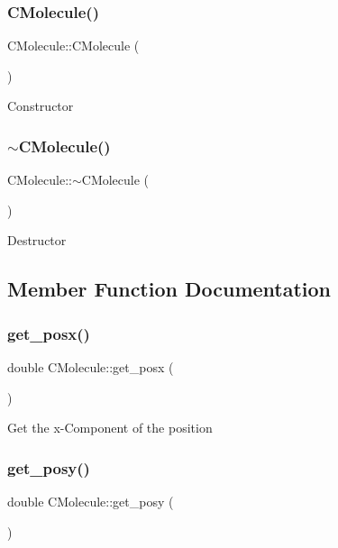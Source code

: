 \subsubsection{\texorpdfstring{C\+Molecule()}{CMolecule()}}
{\footnotesize\ttfamily C\+Molecule\+::\+C\+Molecule (\begin{DoxyParamCaption}{ }\end{DoxyParamCaption})}

Constructor \mbox{\label{classCMolecule_a8e59e7e7ff05b619a9e201c3263921c5}} 
\subsubsection{\texorpdfstring{$\sim$\+C\+Molecule()}{~CMolecule()}}
{\footnotesize\ttfamily C\+Molecule\+::$\sim$\+C\+Molecule (\begin{DoxyParamCaption}{ }\end{DoxyParamCaption})\hspace{0.3cm}{\ttfamily [virtual]}}

Destructor 

\subsection{Member Function Documentation}
\mbox{\label{classCMolecule_ac76dbb1e5abbc9fbadcd568d0f2e7d16}} 
\subsubsection{\texorpdfstring{get\+\_\+posx()}{get\_posx()}}
{\footnotesize\ttfamily double C\+Molecule\+::get\+\_\+posx (\begin{DoxyParamCaption}{ }\end{DoxyParamCaption})}

Get the x-\/\+Component of the position \mbox{\label{classCMolecule_a8cf1a6b995c8cbf4f1881f6f38ebca02}} 
\subsubsection{\texorpdfstring{get\+\_\+posy()}{get\_posy()}}
{\footnotesize\ttfamily double C\+Molecule\+::get\+\_\+posy (\begin{DoxyParamCaption}{ }\end{DoxyParamCaption})}

